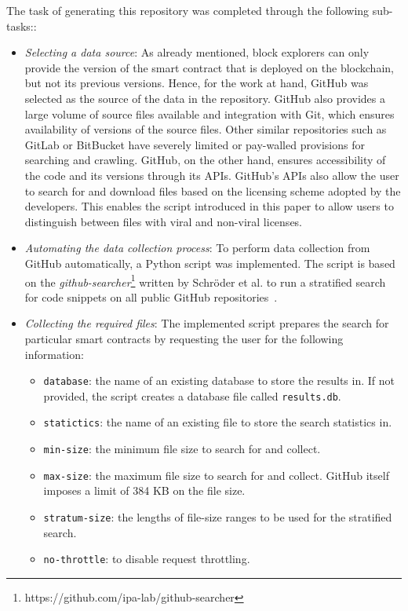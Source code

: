 \documentclass[10pt,conference]{IEEEtran}
\begin{document}
	The task of generating this repository was completed through the following sub-tasks::
	\begin{itemize}
		\item \textit{Selecting a data source}: As already mentioned, block explorers can only provide the version of the smart contract that is deployed on the blockchain, but not its previous versions. Hence, for the work at hand, GitHub was selected as the source of the data in the repository. GitHub also provides a large volume of source files available and integration with Git, which ensures availability of versions of the source files. Other similar repositories such as GitLab or BitBucket have severely limited or pay-walled provisions for searching and crawling. GitHub, on the other hand, ensures accessibility of the code and its versions through its APIs. GitHub's APIs also allow the user to search for and download files based on the licensing scheme adopted by the developers. This enables the script introduced in this paper to allow users to distinguish between files with viral and non-viral licenses. 
		\item \textit{Automating the data collection process}: To perform data collection from GitHub automatically, a Python script was implemented. The script is based on the \textit{github-searcher}\footnote{https://github.com/ipa-lab/github-searcher} written by Schröder et al. to run a stratified search for code snippets on all public GitHub repositories~\cite{schroder}.
		\item \textit{Collecting the required files}: The implemented script prepares the search for particular smart contracts by requesting the user for the following information:
		\begin{itemize}
			\item \texttt{database}: the name of an existing database to store the results in. If not provided, the script creates a database file called \texttt{results.db}.
			\item \texttt{statictics}: the name of an existing file to store the search statistics in.
			\item \texttt{min-size}: the minimum file size to search for and collect.
			\item \texttt{max-size}: the maximum file size to search for and collect. GitHub itself imposes a limit of 384 KB on the file size.
			\item \texttt{stratum-size}: the lengths of file-size ranges to be used for the stratified search.
			\item \texttt{no-throttle}: to disable request throttling.

\end{itemize}
\end{itemize}
\end{document}
